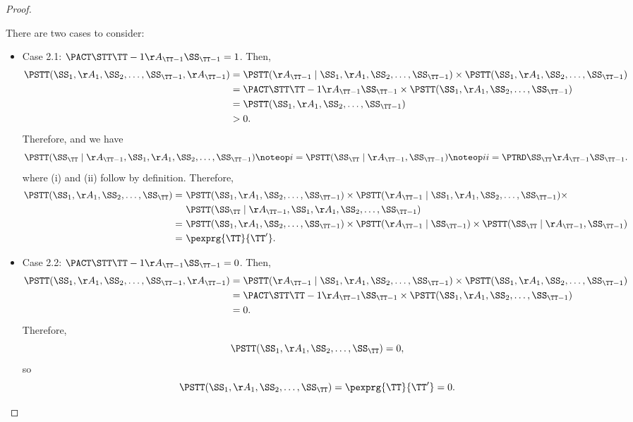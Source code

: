 \begin{proof}
\begin{itemize}
      There are two cases to consider:
      \begin{itemize}
        \item Case 2.1: $\isact = 1$.
          Then,
          \begin{align*}
            \ismid &= \isbf \times \isa\\
                   &= \isact \times \isa\\
                   &= \isa\\
                   &> 0.
          \end{align*}
          Therefore, 
          and we have
          $$\iscf \noteop i = \isc \noteop ii = \istrd.$$
          where (i) and (ii) follow by definition.
          Therefore,
          \begin{align*}
            \isjoint =\ & \isa \times \isbf \times\\& \iscf\\
            =\ & \isa \times \isb \times \isc\\
            =\ & \pexprg{\TT}{\TT'}.
          \end{align*}

        \item Case 2.2: $\isact = 0$.
          Then,
          \begin{align*}
            \ismid &= \isbf \times \isa\\
                   &= \isact \times \isa\\
                   &= 0.
          \end{align*}
          Therefore,
          $$\isjoint = 0,$$
          so
          $$\isjoint = \pexprg{\TT}{\TT'} = 0.$$
      \end{itemize}
  \end{itemize}
\end{proof}
